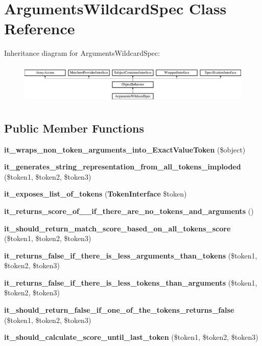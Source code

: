 \section{Arguments\+Wildcard\+Spec Class Reference}
\label{classspec_1_1_prophecy_1_1_argument_1_1_arguments_wildcard_spec}
Inheritance diagram for Arguments\+Wildcard\+Spec\+:\begin{figure}[H]
\begin{center}
\leavevmode
\includegraphics[height=1.953488cm]{classspec_1_1_prophecy_1_1_argument_1_1_arguments_wildcard_spec}
\end{center}
\end{figure}
\subsection*{Public Member Functions}
\begin{DoxyCompactItemize}
\item 
{\bf it\+\_\+wraps\+\_\+non\+\_\+token\+\_\+arguments\+\_\+into\+\_\+\+Exact\+Value\+Token} (\$object)
\item 
{\bf it\+\_\+generates\+\_\+string\+\_\+representation\+\_\+from\+\_\+all\+\_\+tokens\+\_\+imploded} (\$token1, \$token2, \$token3)
\item 
{\bf it\+\_\+exposes\+\_\+list\+\_\+of\+\_\+tokens} ({\bf Token\+Interface} \$token)
\item 
{\bf it\+\_\+returns\+\_\+score\+\_\+of\+\_\+\_\+if\+\_\+there\+\_\+are\+\_\+no\+\_\+tokens\+\_\+and\+\_\+arguments} ()
\item 
{\bf it\+\_\+should\+\_\+return\+\_\+match\+\_\+score\+\_\+based\+\_\+on\+\_\+all\+\_\+tokens\+\_\+score} (\$token1, \$token2, \$token3)
\item 
{\bf it\+\_\+returns\+\_\+false\+\_\+if\+\_\+there\+\_\+is\+\_\+less\+\_\+arguments\+\_\+than\+\_\+tokens} (\$token1, \$token2, \$token3)
\item 
{\bf it\+\_\+returns\+\_\+false\+\_\+if\+\_\+there\+\_\+is\+\_\+less\+\_\+tokens\+\_\+than\+\_\+arguments} (\$token1, \$token2, \$token3)
\item 
{\bf it\+\_\+should\+\_\+return\+\_\+false\+\_\+if\+\_\+one\+\_\+of\+\_\+the\+\_\+tokens\+\_\+returns\+\_\+false} (\$token1, \$token2, \$token3)
\item 
{\bf it\+\_\+should\+\_\+calculate\+\_\+score\+\_\+until\+\_\+last\+\_\+token} (\$token1, \$token2, \$token3)
\end{DoxyCompactItemize}

